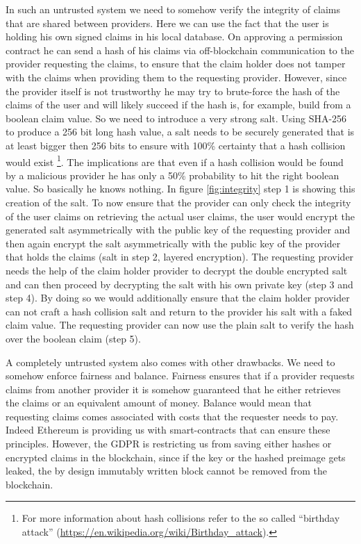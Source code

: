In such an untrusted system we need to somehow verify the integrity of claims that are shared between providers.
Here we can use the fact that the user is holding his own signed claims in his local database.
On approving a permission contract he can send a hash of his claims via off-blockchain communication to the provider requesting the claims,
to ensure that the claim holder does not tamper with the claims when providing them to the requesting provider.
However, since the provider itself is not trustworthy he may try to brute-force the hash of the claims of the user and will
likely succeed if the hash is, for example, build from a boolean claim value. So we need to introduce a very strong salt.
Using SHA-256 to produce a 256 bit long hash value, a salt needs to be securely generated that is at least bigger
then 256 bits to ensure with 100\% certainty that a hash collision would exist
\footnote{For more information about hash collisions refer to the so called “birthday attack”
(\url{https://en.wikipedia.org/wiki/Birthday_attack}).}.
The implications are that even if a hash collision would be found by a malicious provider he has only a
50\% probability to hit the right boolean value. So basically he knows nothing. In figure \ref{fig:integrity}
step 1 is showing this creation of the salt. To now ensure that the provider can only check the integrity of
the user claims on retrieving the actual user claims, the user would encrypt the generated salt asymmetrically with
the public key of the requesting provider and then again encrypt the salt asymmetrically with the public key of
the provider that holds the claims (salt in step 2, layered encryption). The requesting provider needs the help of the
claim holder provider to decrypt the double encrypted salt and can then proceed by decrypting the salt with his own
private key (step 3 and step 4). By doing so we would additionally ensure that the claim holder provider can not craft
a hash collision salt and return to the provider his salt with a faked claim value.  The requesting provider can now use
the plain salt to verify the hash over the boolean claim (step 5).

A completely untrusted system also comes with other drawbacks. We need to somehow enforce fairness and balance. Fairness ensures that if a provider requests claims from another provider it is somehow guaranteed that he either retrieves the claims or an equivalent amount of money. Balance would mean that requesting claims comes associated with costs that the requester needs to pay. Indeed Ethereum is providing us with smart-contracts that can ensure these principles. However, the GDPR is restricting us from saving either hashes or encrypted claims in the blockchain, since if the key or the hashed preimage gets leaked, the by design immutably written block cannot be removed from the blockchain.

